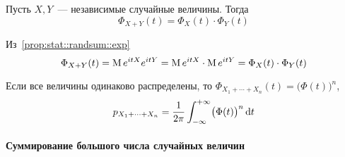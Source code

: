 \documentclass[12pt,timbord]{../../../notes}
\begin{document}
\begin{prop}\label{prop:stat::charfunsum::sum}
  Пусть $X,Y$~--- независимые случайные величины. Тогда 
  \[
    \Phi_{X+Y}(t) = \Phi_X(t) \cdot \Phi_Y(t)
  \]
\end{prop}
\begin{itlproof}
  Из~\ref{prop:stat::randsum::exp}  
  \[
    \Phi_{X+Y}(t) = \operatorname{M} e^{itX} e^{itY} = \operatorname{M} e^{itX} \cdot \operatorname{M} e^{itY} = \Phi_{X}(t) \cdot
    \Phi_Y (t)
  \]
\end{itlproof}
\begin{cor}\label{conj:stat::charfunsum::sumn}
  Если все величины одинаково распределены, то $\Phi_{X_1 + \dotsb + X_n}(t) =
  \bigl(\Phi(t)\bigr)^n$, \[
    p_{X_1 + \dotsb + X_n} = \frac{1}{2\pi} \int_{-\infty}^{+\infty} \bigl(\Phi(t)\bigr)^n \, \mathrm{d} t 
  \]
\end{cor}

\paragraph{Суммирование большого числа случайных величин}
\label{par:stat::randlimsum}
\flame\underdev\sour
\end{document}
